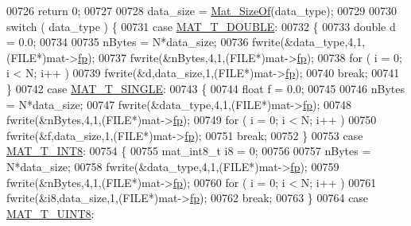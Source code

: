 \begin{DoxyCode}
{{{{00726         \textcolor{keywordflow}{return} 0;
00727 
00728     data\_size = \hyperlink{group__mat__util_gab6774aabdc124c540c1e7686d0804940}{Mat\_SizeOf}(data\_type);
00729 
00730     \textcolor{keywordflow}{switch} ( data\_type ) \{
00731         \textcolor{keywordflow}{case} \hyperlink{group___m_a_t_ggacf7b3b879282b7ab3a51190e49bf3453a31e721ecf7e188196f83c32838288797}{MAT\_T\_DOUBLE}:
00732         \{
00733             \textcolor{keywordtype}{double} d = 0.0;
00734 
00735             nBytes = N*data\_size;
00736             fwrite(&data\_type,4,1,(FILE*)mat->\hyperlink{struct__mat__t_a85f562e407ca9ad4d2a6e14f839432b7}{fp});
00737             fwrite(&nBytes,4,1,(FILE*)mat->\hyperlink{struct__mat__t_a85f562e407ca9ad4d2a6e14f839432b7}{fp});
00738             \textcolor{keywordflow}{for} ( i = 0; i < N; i++ )
00739                 fwrite(&d,data\_size,1,(FILE*)mat->\hyperlink{struct__mat__t_a85f562e407ca9ad4d2a6e14f839432b7}{fp});
00740             \textcolor{keywordflow}{break};
00741         \}
00742         \textcolor{keywordflow}{case} \hyperlink{group___m_a_t_ggacf7b3b879282b7ab3a51190e49bf3453a3a3657d40e9212c923d9b9d03531b64c}{MAT\_T\_SINGLE}:
00743         \{
00744             \textcolor{keywordtype}{float} f = 0.0;
00745 
00746             nBytes = N*data\_size;
00747             fwrite(&data\_type,4,1,(FILE*)mat->\hyperlink{struct__mat__t_a85f562e407ca9ad4d2a6e14f839432b7}{fp});
00748             fwrite(&nBytes,4,1,(FILE*)mat->\hyperlink{struct__mat__t_a85f562e407ca9ad4d2a6e14f839432b7}{fp});
00749             \textcolor{keywordflow}{for} ( i = 0; i < N; i++ )
00750                 fwrite(&f,data\_size,1,(FILE*)mat->\hyperlink{struct__mat__t_a85f562e407ca9ad4d2a6e14f839432b7}{fp});
00751             \textcolor{keywordflow}{break};
00752         \}
00753         \textcolor{keywordflow}{case} \hyperlink{group___m_a_t_ggacf7b3b879282b7ab3a51190e49bf3453a9807f5033ed4f9b548953742d9fd1658}{MAT\_T\_INT8}:
00754         \{
00755             mat\_int8\_t i8 = 0;
00756 
00757             nBytes = N*data\_size;
00758             fwrite(&data\_type,4,1,(FILE*)mat->\hyperlink{struct__mat__t_a85f562e407ca9ad4d2a6e14f839432b7}{fp});
00759             fwrite(&nBytes,4,1,(FILE*)mat->\hyperlink{struct__mat__t_a85f562e407ca9ad4d2a6e14f839432b7}{fp});
00760             \textcolor{keywordflow}{for} ( i = 0; i < N; i++ )
00761                 fwrite(&i8,data\_size,1,(FILE*)mat->\hyperlink{struct__mat__t_a85f562e407ca9ad4d2a6e14f839432b7}{fp});
00762             \textcolor{keywordflow}{break};
00763         \}
00764         \textcolor{keywordflow}{case} \hyperlink{group___m_a_t_ggacf7b3b879282b7ab3a51190e49bf3453a01c1bd7db68f90552862eb5d311be408}{MAT\_T\_UINT8}:
}}}}
\end{DoxyCode}
